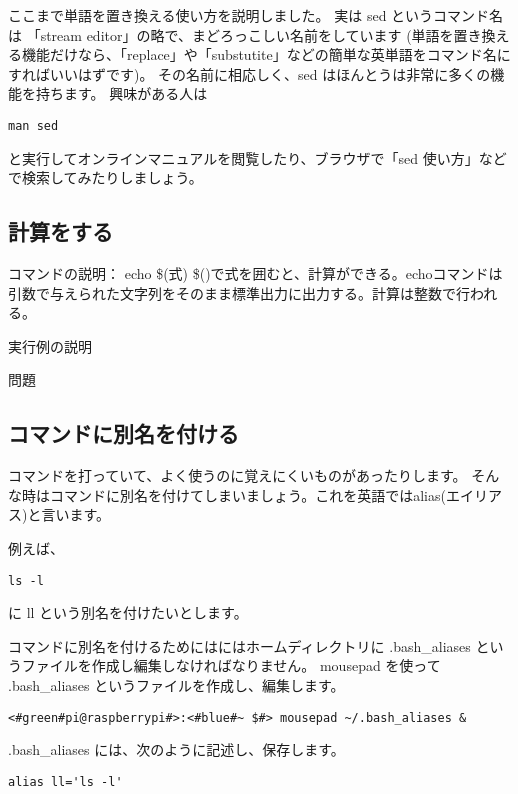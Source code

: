 ここまで単語を置き換える使い方を説明しました。
実は sed というコマンド名は 「stream editor」の略で、まどろっこしい名前をしています
(単語を置き換える機能だけなら、「replace」や「substutite」などの簡単な英単語をコマンド名にすればいいはずです)。
その名前に相応しく、sed はほんとうは非常に多くの機能を持ちます。
興味がある人は

\begin{lstlisting}
man sed
\end{lstlisting}

と実行してオンラインマニュアルを閲覧したり、ブラウザで「sed 使い方」などで検索してみたりしましょう。

\subsection{計算をする}

コマンドの説明： echo \$(式)
\$()で式を囲むと、計算ができる。echoコマンドは引数で与えられた文字列をそのまま標準出力に出力する。計算は整数で行われる。


実行例の説明

問題

\subsection{コマンドに別名を付ける}

コマンドを打っていて、よく使うのに覚えにくいものがあったりします。
そんな時はコマンドに別名を付けてしまいましょう。これを英語ではalias(エイリアス)と言います。

例えば、

\begin{lstlisting}[caption=lsコマンド, label=lsAlias]
    ls -l
\end{lstlisting}

に ll という別名を付けたいとします。

コマンドに別名を付けるためにはにはホームディレクトリに .bash{\_}aliases というファイルを作成し編集しなければなりません。
mousepad を使って .bash{\_}aliases というファイルを作成し、編集します。
\begin{lstlisting}[caption=.bashaliasesを開く, label=openBashAliases]
    <#green#pi@raspberrypi#>:<#blue#~ $#> mousepad ~/.bash_aliases &
\end{lstlisting}

.bash{\_}aliases には、次のように記述し、保存します。
\begin{lstlisting}[caption=.bashaliasesの中身, label=bashAliasesContents]
    alias ll='ls -l'
\end{lstlisting}

